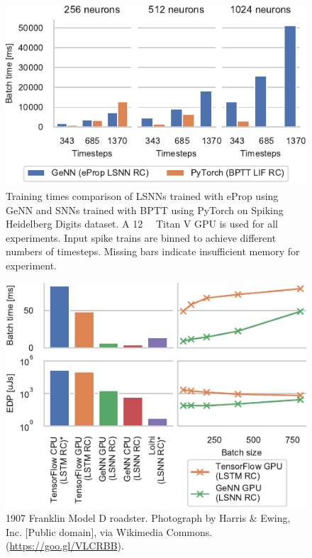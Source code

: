 \documentclass[sigconf,authordraft]{acmart}
\begin{document}
\begin{figure}[t]
  \centering
  \includegraphics{figures/training_time.pdf}
  \caption{Training times comparison of LSNNs trained with eProp using GeNN and SNNs trained with BPTT using PyTorch on Spiking Heidelberg Digits dataset. A \SI{12}{\giga\byte} Titan V GPU is used for all experiments. Input spike trains are binned to achieve different numbers of timesteps. Missing bars indicate insufficient memory for experiment.}
  \label{fig:training_time}
\end{figure}

\begin{figure}[t]
  \centering
  \includegraphics{figures/lstm_vs_genn.pdf}
  \caption{1907 Franklin Model D roadster. Photograph by Harris \&
    Ewing, Inc. [Public domain], via Wikimedia
    Commons. (\url{https://goo.gl/VLCRBB}).}
  \label{fig:lstm_vs_genn}
\end{figure}
\end{document}
